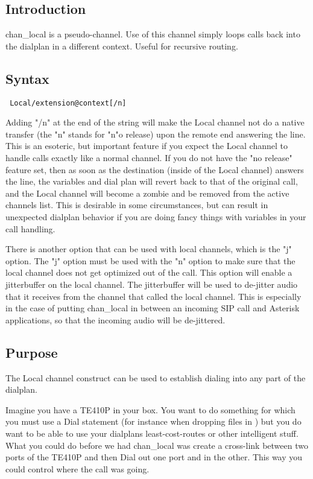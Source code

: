 \subsection{Introduction}

chan\_local is a pseudo-channel. Use of this channel simply loops calls back 
into the dialplan in a different context. Useful for recursive routing.

\subsection{Syntax}
\begin{verbatim}
 Local/extension@context[/n]
\end{verbatim}

Adding "/n" at the end of the string will make the Local channel not do a 
native transfer (the "n" stands for "n"o release) upon the remote end answering 
the line. This is an esoteric, but important feature if you expect the Local 
channel to handle calls exactly like a normal channel. If you do not have the 
"no release" feature set, then as soon as the destination (inside of the Local 
channel) answers the line, the variables and dial plan will revert back to that 
of the original call, and the Local channel will become a zombie and be removed 
from the active channels list. This is desirable in some circumstances, but can 
result in unexpected dialplan behavior if you are doing fancy things with 
variables in your call handling.

There is another option that can be used with local channels, which is the "j" 
option.  The "j" option must be used with the "n" option to make sure that the 
local channel does not get optimized out of the call.  This option will enable 
a jitterbuffer on the local channel.  The jitterbuffer will be used to de-jitter 
audio that it receives from the channel that called the local channel.  This is 
especially in the case of putting chan\_local in between an incoming SIP call 
and Asterisk applications, so that the incoming audio will be de-jittered.

\subsection{Purpose}

The Local channel construct can be used to establish dialing into any part of 
the dialplan.

Imagine you have a TE410P in your box. You want to do something for which you 
must use a Dial statement (for instance when dropping files in 
) but you do want to be able to use your dialplans 
least-cost-routes or other intelligent stuff. What you could do before we had 
chan\_local was create a cross-link between two ports of the TE410P and then 
Dial out one port and in the other. This way you could control where the call 
was going.

